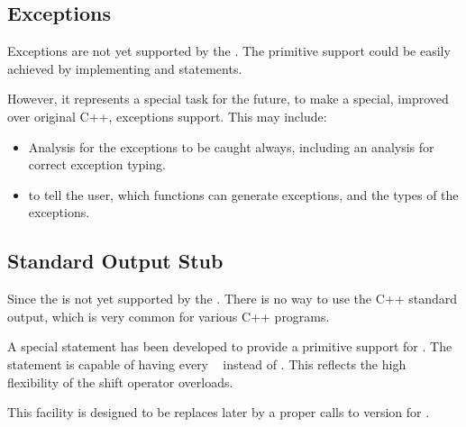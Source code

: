 
\subsection{Exceptions}

Exceptions are not yet supported by the \pcpp. The primitive support could be 
easily achieved by implementing  and  statements.

However, it represents a special task for the future, to make a special, improved over 
original C++, exceptions support. This may include:

\begin{itemize}
 \item Analysis for the exceptions to be caught always, including an analysis for 
 correct exception typing.
 \item {} to tell the user, which functions can generate
 exceptions, and the types of the exceptions.
\end{itemize}



\subsection{Standard Output Stub}

Since the  is not yet supported by the \pcpp. There is no way to 
use the C++ standard output, which is very common for various C++ programs.

A special statement has been developed to provide a primitive support for 
. The  statement is capable of having every 
\jbmps\  instead of . This reflects the high flexibility
of the  shift operator overloads.

This facility is designed to be replaces later by a proper calls to 
version for \pcpp.